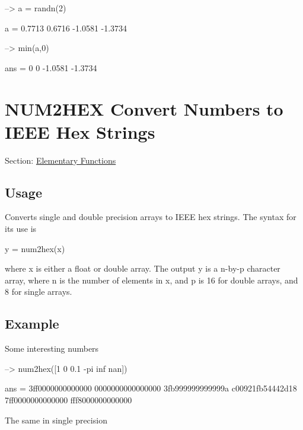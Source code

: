 \begin{DoxyVerbInclude}
--> a = randn(2)

a = 
    0.7713    0.6716 
   -1.0581   -1.3734 

--> min(a,0)

ans = 
         0         0 
   -1.0581   -1.3734 
\end{DoxyVerbInclude}
 \hypertarget{elementary_num2hex}{}\section{N\-U\-M2\-H\-E\-X Convert Numbers to I\-E\-E\-E Hex Strings}\label{elementary_num2hex}
Section\-: \hyperlink{sec_elementary}{Elementary Functions} \hypertarget{vtkwidgets_vtkxyplotwidget_Usage}{}\subsection{Usage}\label{vtkwidgets_vtkxyplotwidget_Usage}
Converts single and double precision arrays to I\-E\-E\-E hex strings. The syntax for its use is \begin{DoxyVerb}   y = num2hex(x)
\end{DoxyVerb}
 where {\ttfamily x} is either a {\ttfamily float} or {\ttfamily double} array. The output {\ttfamily y} is a {\ttfamily n-\/by-\/p} character array, where {\ttfamily n} is the number of elements in {\ttfamily x}, and {\ttfamily p} is 16 for {\ttfamily double} arrays, and 8 for {\ttfamily single} arrays. \hypertarget{variables_struct_Example}{}\subsection{Example}\label{variables_struct_Example}
Some interesting numbers


\begin{DoxyVerbInclude}
--> num2hex([1 0 0.1 -pi inf nan])

ans = 
3ff0000000000000
0000000000000000
3fb999999999999a
c00921fb54442d18
7ff0000000000000
fff8000000000000
\end{DoxyVerbInclude}


The same in single precision



